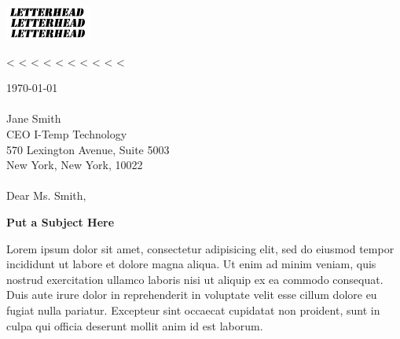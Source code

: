 \documentclass[12pt,a4paper]{letter}
\renewcommand*{\opening}[1]{#1}
\begin{document}
\begin{letter}

\begin{flushright}
\includegraphics[scale=3]{sample-letterhead}
\end{flushright}

\begin{flushleft}
<%
<%
<%
<%
<%
<%
<%
<%
<%
<%
\end{flushleft}

\vspace{0.5cm}

\opening{
  \today \\\\
  Jane Smith \\
  CEO I-Temp Technology \\
  570 Lexington Avenue, Suite 5003 \\
  New York, New York, 10022 \\
  \\
  Dear Ms. Smith,
}

\begin{center}
\textbf{Put a Subject Here}
\end{center}

Lorem ipsum dolor sit amet, consectetur adipisicing elit, sed do eiusmod
tempor incididunt ut labore et dolore magna aliqua. Ut enim ad minim veniam,
quis nostrud exercitation ullamco laboris nisi ut aliquip ex ea commodo
consequat. Duis aute irure dolor in reprehenderit in voluptate velit esse
cillum dolore eu fugiat nulla pariatur. Excepteur sint occaecat cupidatat non
proident, sunt in culpa qui officia deserunt mollit anim id est laborum.


\end{letter}
\end{document}
